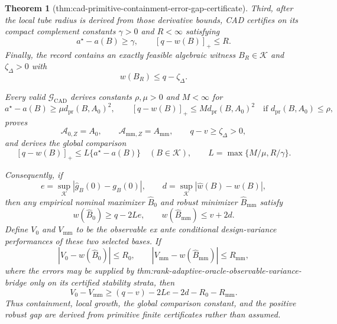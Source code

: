 \documentclass{article}
\newtheorem{theorem}{Theorem}
\begin{document}
\begin{theorem}[thm:cad-primitive-containment-error-gap-certificate]
Third, after the local tube radius is derived from those derivative bounds, CAD certifies on its compact complement constants \(\gamma>0\) and \(R<\infty\) satisfying
\[
a^\star-a(B)\ge\gamma,
\qquad [q-w(B)]_+\le R.
\tag{G2}
\]
Finally, the record contains an exactly feasible algebraic witness \(B_R\in\mathcal K\) and \(\zeta_\Delta>0\) with
\[
w(B_R)\le q-\zeta_\Delta.
\tag{G3}
\]

Every valid \(\mathscr G_{\mathrm{CAD}}\) derives constants \(\rho,\mu>0\) and \(M<\infty\) for
\[
a^\star-a(B)\ge\mu d_{\mathrm{pr}}(B,A_0)^2,
\qquad
[q-w(B)]_+\le M d_{\mathrm{pr}}(B,A_0)^2
\quad\text{if }d_{\mathrm{pr}}(B,A_0)\le\rho,
\tag{G4}
\]
proves
\[
\mathcal A_{0,Z}=A_0,
\qquad \mathcal A_{\mathrm{mm},Z}=A_{\mathrm{mm}},
\qquad q-v\ge\zeta_\Delta>0,
\tag{G5}
\]
and derives the global comparison
\[
[q-w(B)]_+
\le L\{a^\star-a(B)\}
\quad(B\in\mathcal K),
\qquad L=\max\{M/\mu,R/\gamma\}.
\tag{G6}
\]

Consequently, if
\[
e=\sup_{\mathcal K}|\widehat g_B(0)-g_B(0)|,
\qquad d=\sup_{\mathcal K}|\widehat w(B)-w(B)|,
\]
then any empirical nominal maximizer \(\widehat B_0\) and robust minimizer \(\widehat B_{\mathrm{mm}}\) satisfy
\[
w(\widehat B_0)\ge q-2Le,
\qquad w(\widehat B_{\mathrm{mm}})\le v+2d.
\]
Define \(V_0\) and \(V_{\mathrm{mm}}\) to be the observable ex ante conditional design-variance performances of these two selected bases.  If
\[
|V_0-w(\widehat B_0)|\le R_0,
\qquad
|V_{\mathrm{mm}}-w(\widehat B_{\mathrm{mm}})|\le R_{\mathrm{mm}},
\]
where the errors may be supplied by thm:rank-adaptive-oracle-observable-variance-bridge only on its certified stability strata, then
\[
V_0-V_{\mathrm{mm}}
\ge(q-v)-2Le-2d-R_0-R_{\mathrm{mm}}.
\tag{G7}
\]
Thus containment, local growth, the global comparison constant, and the positive robust gap are derived from primitive finite certificates rather than assumed.
\end{theorem}
\end{document}
